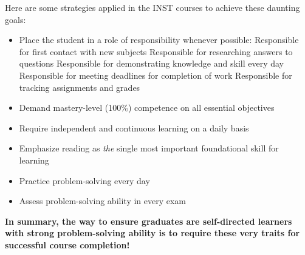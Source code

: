 \vskip 20pt


\noindent
Here are some strategies applied in the INST courses to achieve these daunting goals:

\begin{itemize}
\item{} Place the student in a role of responsibility whenever possible:
\itemitem{} Responsible for first contact with new subjects
\itemitem{} Responsible for researching answers to questions
\itemitem{} Responsible for demonstrating knowledge and skill every day
\itemitem{} Responsible for meeting deadlines for completion of work
\itemitem{} Responsible for tracking assignments and grades
\item{} Demand mastery-level (100\%) competence on all essential objectives
\item{} Require independent and continuous learning on a daily basis
\item{} Emphasize reading as {\it the} single most important foundational skill for learning
\item{} Practice problem-solving every day 
\item{} Assess problem-solving ability in every exam
\end{itemize}

\noindent
{\bf In summary, the way to ensure graduates are self-directed learners with strong problem-solving ability is to require these very traits for successful course completion!}






